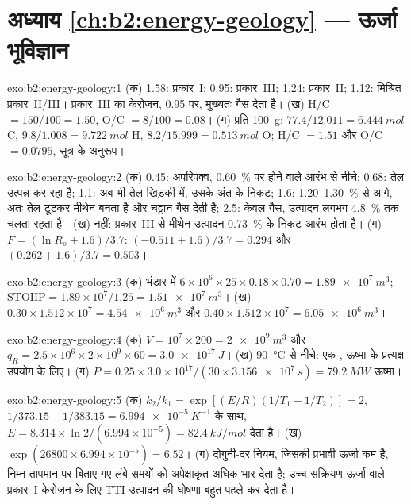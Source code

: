 \section*{अध्याय \ref{ch:b2:energy-geology} --- ऊर्जा भूविज्ञान}

\begin{solution}{exo:b2:energy-geology:1}
(क) 1.58: प्रकार~I; 0.95: प्रकार~III; 1.24: प्रकार~II; 1.12: मिश्रित प्रकार~II/III। प्रकार~III का केरोजन,
0.95 पर, मुख्यतः गैस देता है। (ख) H/C $= 150/100 = 1.50$, O/C $= 8/100 = 0.08$। (ग) प्रति \qty{100}{g}:
$77.4/12.011 = \qty{6.444}{mol}$ C, $9.8/1.008 = \qty{9.722}{mol}$ H, $8.2/15.999 =
\qty{0.513}{mol}$ O; H/C $= 1.51$ और O/C $= 0.0795$, सूत्र के अनुरूप।
\end{solution}

\begin{solution}{exo:b2:energy-geology:2}
(क) 0.45: अपरिपक्व, \qty{0.60}{\percent} पर होने वाले आरंभ से नीचे; 0.68: तेल उत्पन्न कर रहा है; 1.1: अब भी
तेल-खिड़की में, उसके अंत के निकट; 1.6: 1.20--\qty{1.30}{\percent} से आगे, अतः तेल टूटकर मीथेन बनता है और
चट्टान गैस देती है; 2.5: केवल गैस, उत्पादन लगभग \qty{4.8}{\percent} तक चलता रहता है। (ख) नहीं: प्रकार~III से
मीथेन-उत्पादन \qty{0.73}{\percent} के निकट आरंभ होता है। (ग) $F = (\ln R_o + 1.6)/3.7$: $(-0.511 +
1.6)/3.7 = 0.294$ और $(0.262 + 1.6)/3.7 = 0.503$।
\end{solution}

\begin{solution}{exo:b2:energy-geology:3}
(क) भंडार में $6 \times 10^6 \times 25 \times 0.18 \times 0.70 = \qty{1.89e7}{m^3}$;
$\mathrm{STOIIP} = 1.89 \times 10^7/1.25 = \qty{1.51e7}{m^3}$। (ख) $0.30 \times 1.512 \times 10^7 =
\qty{4.54e6}{m^3}$ और $0.40 \times 1.512 \times 10^7 = \qty{6.05e6}{m^3}$।
\end{solution}

\begin{solution}{exo:b2:energy-geology:4}
(क) $V = 10^7 \times 200 = \qty{2e9}{m^3}$ और $q_R = 2.5 \times 10^6 \times 2 \times 10^9 \times 60
= \qty{3.0e17}{J}$। (ख) \qty{90}{\celsius} से नीचे: एक , ऊष्मा के प्रत्यक्ष उपयोग के
लिए। (ग) $P = 0.25 \times 3.0 \times 10^{17}/(30 \times \qty{3.156e7}{s}) = \qty{79.2}{MW}$ ऊष्मा।
\end{solution}

\begin{solution}{exo:b2:energy-geology:5}
(क) $k_2/k_1 = \exp[(E/R)(1/T_1 - 1/T_2)] = 2$, $1/373.15 - 1/383.15 = \qty{6.994e-5}{K^{-1}}$ के साथ,
$E = 8.314 \times \ln 2/(6.994 \times 10^{-5}) = \qty{82.4}{kJ/mol}$ देता है। (ख) $\exp(26800 \times
6.994 \times 10^{-5}) = 6.52$। (ग) दोगुनी-दर नियम, जिसकी प्रभावी ऊर्जा कम है, निम्न तापमान पर बिताए गए
लंबे समयों को अपेक्षाकृत अधिक भार देता है; उच्च सक्रियण ऊर्जा वाले प्रकार~I केरोजन के लिए TTI उत्पादन की
घोषणा बहुत पहले कर देता है।
\end{solution}

